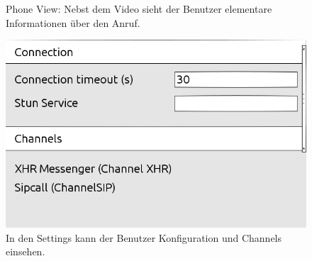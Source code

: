 \begin{landscape}
\begin{figure}[H]
		\caption{Phone View: Nebst dem Video sieht der Benutzer elementare Informationen über den Anruf.}
		\label{settings screen}
	\end{figure}
	\begin{figure}[H]
		\centering
		\includegraphics[height=0.6\textwidth]{../ui/img/uiDraft2/SettingsView.png}
		\caption{In den Settings kann der Benutzer Konfiguration und Channels einsehen.}
		\label{settings screen}
	\end{figure}
\end{landscape} 